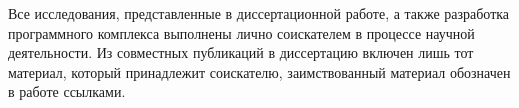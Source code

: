 {\contribution}
Все исследования, представленные в диссертационной работе, а также разработка программного комплекса выполнены лично соискателем в процессе научной деятельности. Из совместных публикаций в диссертацию включен лишь тот материал, который принадлежит соискателю, заимствованный материал обозначен в работе ссылками.


